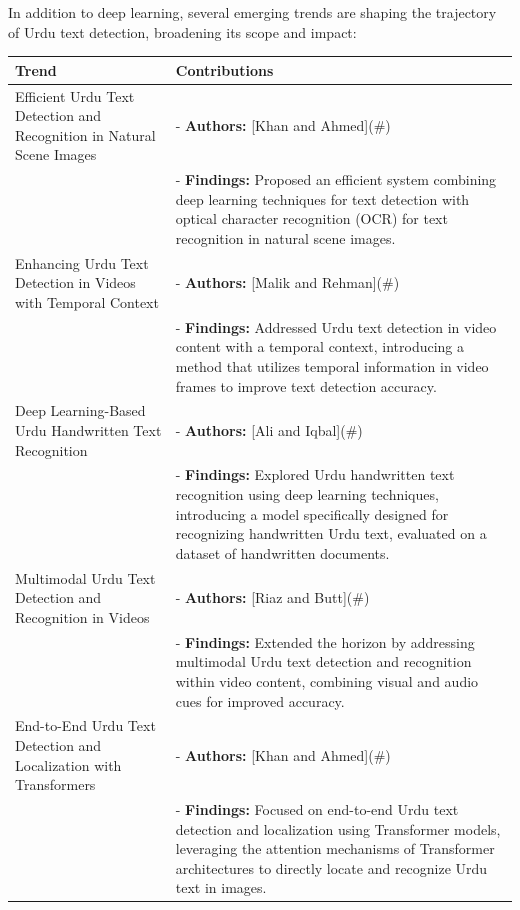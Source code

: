 \documentclass[default,iicol]{sn-jnl}%
\begin{document}
	In addition to deep learning, several emerging trends are shaping the trajectory of Urdu text detection, broadening its scope and impact:
	
	\begin{table}[ht]
		\centering
		\begin{tabular}{|p{3cm}|p{6cm}|}
			\hline
			\textbf{Trend} & \textbf{Contributions} \\
			\hline
			Efficient Urdu Text Detection and Recognition in Natural Scene Images & 
			- \textbf{Authors:} [Khan and Ahmed](\#) \\
			& - \textbf{Findings:} Proposed an efficient system combining deep learning techniques for text detection with optical character recognition (OCR) for text recognition in natural scene images. \\
			\hline
			Enhancing Urdu Text Detection in Videos with Temporal Context & 
			- \textbf{Authors:} [Malik and Rehman](\#) \\
			& - \textbf{Findings:} Addressed Urdu text detection in video content with a temporal context, introducing a method that utilizes temporal information in video frames to improve text detection accuracy. \\
			\hline
			Deep Learning-Based Urdu Handwritten Text Recognition & 
			- \textbf{Authors:} [Ali and Iqbal](\#) \\
			& - \textbf{Findings:} Explored Urdu handwritten text recognition using deep learning techniques, introducing a model specifically designed for recognizing handwritten Urdu text, evaluated on a dataset of handwritten documents. \\
			\hline
			Multimodal Urdu Text Detection and Recognition in Videos & 
			- \textbf{Authors:} [Riaz and Butt](\#) \\
			& - \textbf{Findings:} Extended the horizon by addressing multimodal Urdu text detection and recognition within video content, combining visual and audio cues for improved accuracy. \\
			\hline
			End-to-End Urdu Text Detection and Localization with Transformers & 
			- \textbf{Authors:} [Khan and Ahmed](\#) \\
			& - \textbf{Findings:} Focused on end-to-end Urdu text detection and localization using Transformer models, leveraging the attention mechanisms of Transformer architectures to directly locate and recognize Urdu text in images. \\
			\hline
		\end{tabular}
	\end{table}
	
\end{document}
